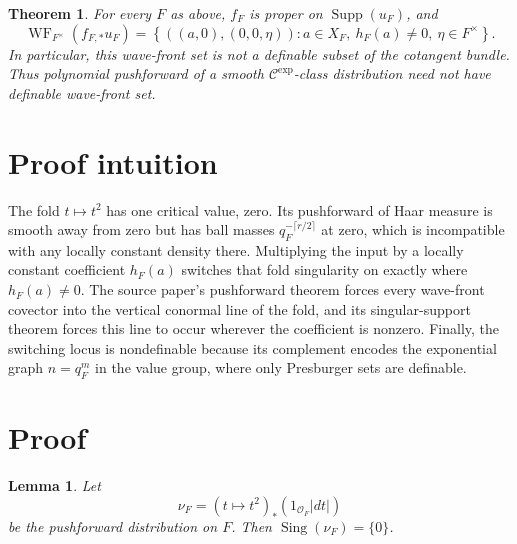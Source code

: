 \documentclass[11pt]{article}
\newtheorem{theorem}{Theorem}
\newtheorem{lemma}{Lemma}
\newcommand{\cO}{\mathcal O}
\newcommand{\cCexp}{\mathcal C^{\mathrm{exp}}}
\newcommand{\WF}{\operatorname{WF}}
\newcommand{\Sing}{\operatorname{Sing}}
\begin{document}
\begin{theorem}\label{thm:main}
For every \(F\) as above, \(f_F\) is proper on \(\operatorname{Supp}(u_F)\),
and
\begin{equation}\label{eq:wf}
\WF_{F^\times}(f_{F,*}u_F)
=
\left\{
 ((a,0),(0,0,\eta)):
 a\in X_F,\ h_F(a)\ne0,\ \eta\in F^\times
\right\}.
\end{equation}
In particular, this wave-front set is not a definable subset of the cotangent
bundle.  Thus polynomial pushforward of a smooth \(\cCexp\)-class
distribution need not have definable wave-front set.
\end{theorem}

\section{Proof intuition}

The fold \(t\mapsto t^2\) has one critical value, zero.  Its pushforward of
Haar measure is smooth away from zero but has ball masses
\(q_F^{-\lceil r/2\rceil}\) at zero, which is incompatible with any locally
constant density there.  Multiplying the input by a locally constant
coefficient \(h_F(a)\) switches that fold singularity on exactly where
\(h_F(a)\ne0\).  The source paper's pushforward theorem forces every
wave-front covector into the vertical conormal line of the fold, and its
singular-support theorem forces this line to occur wherever the coefficient
is nonzero.  Finally, the switching locus is nondefinable because its
complement encodes the exponential graph \(n=q_F^m\) in the value group,
where only Presburger sets are definable.

\section{Proof}

\begin{lemma}\label{lem:fold}
Let
\[
  \nu_F=(t\mapsto t^2)_*(1_{\cO_F}|dt|)
\]
be the pushforward distribution on \(F\).  Then
\(\Sing(\nu_F)=\{0\}\).
\end{lemma}
\end{document}
